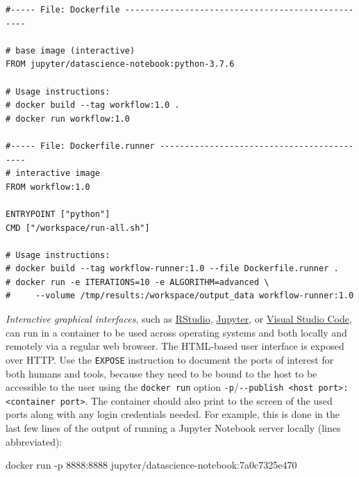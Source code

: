 \documentclass[10pt,letterpaper]{article}
\newenvironment{Shaded}{\begin{snugshade}}{\end{snugshade}}
\newcommand{\ExtensionTok}[1]{#1}
\newcommand{\NormalTok}[1]{#1}
\begin{document}
\begin{minipage}{\linewidth}

\begin{lstlisting}[language=docker,caption={Workflow \texttt{Dockerfile} and derived "runner image" \texttt{Dockerfile} with file name \texttt{Dockerfile.runner}.},breaklines=true,label={lst:runnerimage}]
#----- File: Dockerfile --------------------------------------------------

# base image (interactive)
FROM jupyter/datascience-notebook:python-3.7.6

# Usage instructions:
# docker build --tag workflow:1.0 .
# docker run workflow:1.0

#----- File: Dockerfile.runner -------------------------------------------
# interactive image
FROM workflow:1.0

ENTRYPOINT ["python"]
CMD ["/workspace/run-all.sh"]

# Usage instructions:
# docker build --tag workflow-runner:1.0 --file Dockerfile.runner .
# docker run -e ITERATIONS=10 -e ALGORITHM=advanced \
#     --volume /tmp/results:/workspace/output_data workflow-runner:1.0
\end{lstlisting}

\end{minipage}

\normalsize

\emph{Interactive graphical interfaces}, such as
\href{https://rstudio.com/products/rstudio/}{RStudio},
\href{https://jupyter.org/}{Jupyter}, or
\href{https://code.visualstudio.com/}{Visual Studio Code}, can run in a
container to be used across operating systems and both locally and
remotely via a regular web browser. The HTML-based user interface is
exposed over HTTP. Use the \texttt{EXPOSE} instruction to document the
ports of interest for both humans and tools, because they need to be
bound to the host to be accessible to the user using the
\texttt{docker\ run} option
\texttt{-p}/\texttt{-\/-publish\ \textless{}host\ port\textgreater{}:\textless{}container\ port\textgreater{}}.
The container should also print to the screen of the used ports along
with any login credentials needed. For example, this is done in the last
few lines of the output of running a Jupyter Notebook server locally
(lines abbreviated):

\footnotesize

\begin{Shaded}
\begin{Highlighting}[]
\ExtensionTok{docker}\NormalTok{ run -p 8888:8888 jupyter/datascience-notebook:7a0c7325e470}
\end{Highlighting}
\end{Shaded}
\end{document}
